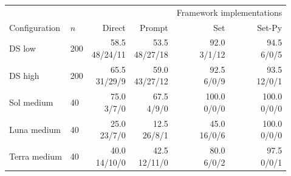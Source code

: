\begin{tabular}{@{}llrrrr@{}}
\toprule
& & & & \multicolumn{2}{c}{Framework implementations}\\
\cmidrule(l){5-6}
Configuration & $n$ & Direct & Prompt & Set & Set-Py\\
\midrule
DS low & 200 & \shortstack[r]{58.5\\{\scriptsize 48/24/11}} & \shortstack[r]{53.5\\{\scriptsize 48/27/18}} & \shortstack[r]{92.0\\{\scriptsize 3/1/12}} & \shortstack[r]{94.5\\{\scriptsize 6/0/5}}\\[3pt]
DS high & 200 & \shortstack[r]{65.5\\{\scriptsize 31/29/9}} & \shortstack[r]{59.0\\{\scriptsize 43/27/12}} & \shortstack[r]{92.5\\{\scriptsize 6/0/9}} & \shortstack[r]{93.5\\{\scriptsize 12/0/1}}\\[3pt]
Sol medium & 40 & \shortstack[r]{75.0\\{\scriptsize 3/7/0}} & \shortstack[r]{67.5\\{\scriptsize 4/9/0}} & \shortstack[r]{100.0\\{\scriptsize 0/0/0}} & \shortstack[r]{100.0\\{\scriptsize 0/0/0}}\\[3pt]
Luna medium & 40 & \shortstack[r]{25.0\\{\scriptsize 23/7/0}} & \shortstack[r]{12.5\\{\scriptsize 26/8/1}} & \shortstack[r]{45.0\\{\scriptsize 16/0/6}} & \shortstack[r]{100.0\\{\scriptsize 0/0/0}}\\[3pt]
Terra medium & 40 & \shortstack[r]{40.0\\{\scriptsize 14/10/0}} & \shortstack[r]{42.5\\{\scriptsize 12/11/0}} & \shortstack[r]{80.0\\{\scriptsize 6/0/2}} & \shortstack[r]{97.5\\{\scriptsize 0/0/1}}\\[3pt]
\bottomrule
\end{tabular}
